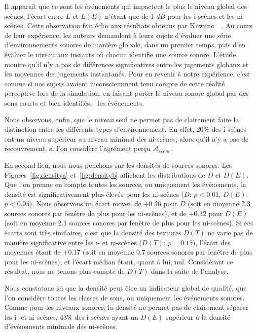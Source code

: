 
Il apparaît que ce sont les événements qui impactent le plus le niveau global des scènes, l'écart entre $L$ et $L(E)$ n'étant que de 1 $dB$ pour les i-scènes et les ni-scènes. Cette observation fait écho aux résultats obtenus par Kuwano~\al~\citep{kuwano_memory_2003}. Au cours de leur expérience, les auteurs demandent à leurs sujets d'évaluer une série d'environnements sonores de manière globale, dans un premier temps, puis d'en évaluer le niveau aux instants où chacun identifie une source sonore. L'étude montre qu'il n'y a pas de différences significatives entre les jugements globaux et les moyennes des jugements instantanés. Pour en revenir à notre expérience, c'est comme si nos sujets avaient inconsciemment tenu compte de cette réalité perceptive lors de la simulation, en faisant porter le niveau sonore global par des sons courts et bien identifiés, \ie~les événements.

Nous observons, enfin, que le niveau seul ne permet pas de clairement faire la distinction entre les différents types d'environnement. En effet, $20\%$ des i-scènes ont un niveau supérieur au niveau minimal des ni-scènes, alors qu'il n'y a pas de recouvrement, si l'on considère l'agrément perçu $\mathcal{A}_{scene}$.

En second lieu, nous nous penchons sur les densités de sources sonores. Les Figures~\ref{fig:densitya} et~\ref{fig:densityb} affichent les distributions de $D$ et $D(E)$. Que l'on prenne en compte toutes les sources, ou uniquement les événements, la densité est significativement plus élevée pour les ni-scènes ($D$: $p<0.01$, $D(E)$: $p<0.05$). Nous observons un écart moyen de $+0.36$ pour $D$ (soit en moyenne 2.3 sources sonores par fenêtre de plus pour les ni-scènes), et de $+0.32$ pour $D(E)$ (soit en moyenne 2.1 sources sonores par fenêtre de plus pour les ni-scènes). Si ces écarts sont très similaires, c'est que la densité des textures $D(T)$ ne varie pas de manière significative entre les i- et ni-scènes ($D(T)$: $p=0.15$), l'écart des moyennes étant de $+0.17$ (soit en moyenne 0.7 sources sonores par fenêtre de plus pour les ni-scènes), et l'écart médian étant, quant à lui, nul. Considérant ce résultat, nous ne tenons plus compte de $D(T)$ dans la suite de l'analyse.

Nous constatons ici que la densité peut être un indicateur global de qualité, que l'on considère toutes les classes de sons, ou uniquement les événements sonores. Comme pour les niveaux sonores, la densité ne permet pas de clairement séparer les i- et ni-scènes, $43\%$ des i-scènes ayant un $D(E)$ supérieur à la densité d'événements minimale des ni-scènes.

